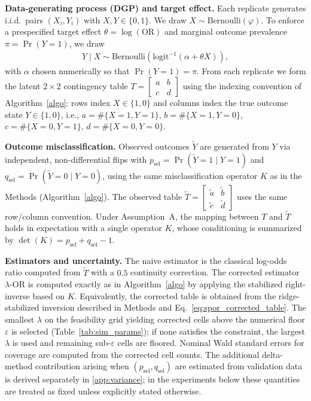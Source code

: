 \documentclass[pdflatex,sn-mathphys-num]{sn-jnl}%
\def\EQSP{3pt}
\newcommand{\cgather}[2][\EQSP]{\begingroup\setlength\abovedisplayskip{#1}\setlength\belowdisplayskip{#1}\begin{gather} #2 \end{gather}\endgroup\noindent}
\newcommand{\SPOR}{\textrm{$\lambda$-OR}}
\theoremstyle{thmstyleone}%
\theoremstyle{thmstyletwo}%
\theoremstyle{thmstylethree}%
\begin{document}
\textbf{Data-generating process (DGP) and target effect.}
Each replicate generates i.i.d.\ pairs \((X_i,Y_i)\) with \(X,Y\in\{0,1\}\).
We draw \(X\sim\mathrm{Bernoulli}(\varphi)\).
To enforce a prespecified target effect
\(\theta=\log(\mathrm{OR})\) and marginal outcome prevalence
\(\pi=\Pr(Y=1)\), we draw
\cgather{
Y\mid X \sim \mathrm{Bernoulli}\!\left(\mathrm{logit}^{-1}(\alpha+\theta X)\right),
}
with \(\alpha\) chosen numerically so that \(\Pr(Y=1)=\pi\).
From each replicate we form the latent \(2\times2\) contingency table
\(
T=\begin{bmatrix}
a & b\\
c & d
\end{bmatrix}
\)
using the indexing convention of Algorithm~\ref{algo}:
rows index \(X\in\{1,0\}\) and columns index the true outcome state
\(Y\in\{1,0\}\), i.e.,
\(a=\#\{X{=}1,Y{=}1\}\),
\(b=\#\{X{=}1,Y{=}0\}\),
\(c=\#\{X{=}0,Y{=}1\}\),
\(d=\#\{X{=}0,Y{=}0\}\).

\textbf{Outcome misclassification.}
Observed outcomes \(\tilde Y\) are generated from \(Y\) via independent,
non-differential flips with
\(p_{\mathrm{sel}}=\Pr(\tilde Y=1\mid Y=1)\)
and
\(q_{\mathrm{sel}}=\Pr(\tilde Y=0\mid Y=0)\),
using the same misclassification operator \(K\) as in the Methods
(Algorithm~\ref{algo}).
The observed table
\(
\tilde T=\begin{bmatrix}
\tilde a & \tilde b\\
\tilde c & \tilde d
\end{bmatrix}
\)
uses the same row/column convention.
Under Assumption~A, the mapping between \(T\) and \(\tilde T\) holds in expectation with a single operator \(K\),
whose conditioning is summarized by
\(\det(K)=p_{\mathrm{sel}}+q_{\mathrm{sel}}-1\).

\textbf{Estimators and uncertainty.}
The naive estimator is the classical log-odds ratio computed from
\(\tilde T\) with a \(0.5\) continuity correction.
The corrected estimator \(\SPOR\) is computed exactly as in
Algorithm~\ref{algo} by applying the stabilized right-inverse based on \(K\).
Equivalently, the corrected table is obtained from the ridge-stabilized inversion
described in Methods and Eq.~\eqref{eq:spor_corrected_table}.
The smallest \(\lambda\) on the feasibility grid yielding corrected cells above
the numerical floor \(\varepsilon\) is selected
(Table~\ref{tab:sim_params}); if none satisfies the constraint,
the largest \(\lambda\) is used and remaining sub-\(\varepsilon\)
cells are floored.
Nominal Wald standard errors for coverage are computed from the corrected cell counts.
The additional delta-method contribution arising when
\((p_{\mathrm{sel}},q_{\mathrm{sel}})\) are estimated from validation data is derived
separately in \ref{app:variance}; in the experiments below these
quantities are treated as fixed unless explicitly stated otherwise.
\end{document}
